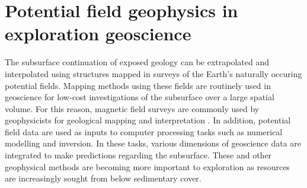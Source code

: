 \documentclass[manuscript.tex]{subfiles}
\begin{document}
\setcounter{chapter}{1}




\section{Potential field geophysics in exploration geoscience}
\label{sec:introgeo}
The subsurface continuation of exposed geology can be extrapolated and interpolated using structures mapped in surveys of the Earth's naturally occuring potential fields.
Mapping methods using these fields are routinely used in geoscience for low-cost investigations of the subsurface over a large spatial volume.
For this reason, magnetic field surveys are commonly used by geophysicists for geological mapping and interpretation \parencite{nabighian75thAnniversaryHistorical2005}.
In addition, potential field data are used as inputs to computer processing tasks such as numerical modelling and inversion.
In these tasks, various dimensions of geoscience data are integrated to make predictions regarding the subsurface.
These and other geophysical methods are becoming more important to exploration as resources are increasingly sought from below sedimentary cover.
\end{document}
